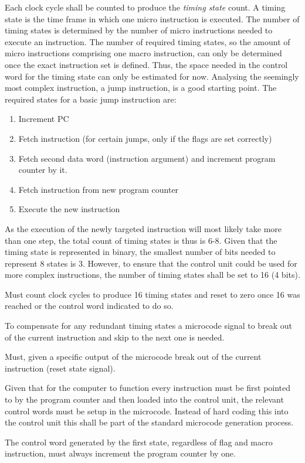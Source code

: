 Each clock cycle shall be counted to produce the \textit{timing state} count. A timing state is the time frame in which one micro instruction is executed. The number of timing states is determined by the number of micro instructions needed to execute an instruction. The number of required timing states, so the amount of micro instructions comprising one macro instruction, can only be determined once the exact instruction set is defined. Thus, the space needed in the control word for the timing state can only be estimated for now. Analysing the seemingly most complex instruction, a jump instruction, is a good starting point.
The required states for a basic jump instruction are: 
\begin{enumerate}
  \item Increment PC
  \item Fetch instruction (for certain jumps, only if the flags are set correctly)
  \item Fetch second data word (instruction argument) and increment program counter by it.
  \item Fetch instruction from new program counter
  \item Execute the new instruction
\end{enumerate}
    
As the execution of the newly targeted instruction will most likely take more than one step, the total count of timing states is thus is 6-8. Given that the timing state is represented in binary, the smallest number of bits needed to represent 8 states is 3. However, to ensure that the control unit could be used for more complex instructions, the number of timing states shall be set to 16 (4 bits).

\begin{arch-requirement}
  Must count clock cycles to produce 16 timing states and reset to zero once 16 was reached or the control word indicated to do so.
\end{arch-requirement}

To compensate for any redundant timing states a microcode signal to break out of the current instruction and skip to the next one is needed. 

\begin{feat-requirement}
  Must, given a specific output of the microcode break out of the current instruction (reset state signal).
\end{feat-requirement}


Given that for the computer to function every instruction must be first pointed to by the program counter and then loaded into the control unit, the relevant control words must be setup in the microcode. Instead of hard coding this into the control unit this shall be part of the standard microcode generation process.
\begin{feat-requirement}
  The control word generated by the first state, regardless of flag and macro instruction, must always increment the program counter by one. 
\end{feat-requirement}

